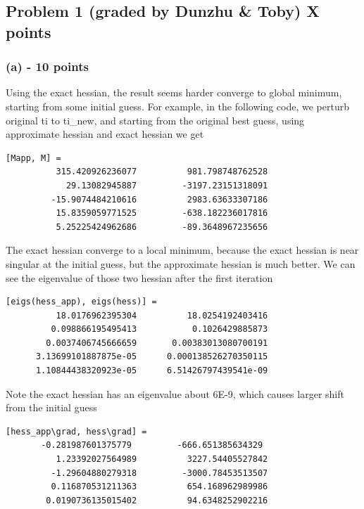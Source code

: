 \documentclass[11pt]{article}
\begin{document}
\lstset{language=Matlab,%
  breaklines=true,%
  morekeywords={matlab2tikz},
  keywordstyle=\color{blue},%
  morekeywords=[2]{1}, keywordstyle=[2]{\color{black}},
  identifierstyle=\color{black},%
  stringstyle=\color{mylilas},
  commentstyle=\color{mygreen},%
  showstringspaces=false,%
  numbers=left,%
  numberstyle={\tiny \color{black}},%
  numbersep=9pt, %
  emph=[1]{for,end,break},emphstyle=[1]\color{red}, %
}


\subsection*{Problem 1 (graded by Dunzhu \& Toby) X points}

\subsubsection*{(a) - 10 points}
Using the exact hessian, the result seems harder converge to global minimum,  starting from some initial guess. For example, in the following code, we perturb original ti to ti\_new, and starting from the original best guess, using approximate hessian and exact hessian we get
\begin{verbatim}
[Mapp, M] = 
          315.420926236077          981.798748762528
            29.13082945887         -3197.23151318091
         -15.9074484210616          2983.63633307186
          15.8359059771525         -638.182236017816
          5.25225424962686         -89.3648967235656
\end{verbatim}

The exact hessian converge to a local minimum, because the exact hessian is near singular at the initial guess, but the approximate hessian is much better. We can see the eigenvalue of those two hessian after the first iteration
\begin{verbatim}
[eigs(hess_app), eigs(hess)] =
          18.0176962395304          18.0254192403416
         0.098866195495413           0.1026429885873
        0.0037406745666659       0.00383013080700191
      3.13699101887875e-05      0.000138526270350115
      1.10844438320923e-05      6.51426797439541e-09
\end{verbatim}
Note the exact hessian has an eigenvalue about 6E-9, which causes larger shift from the initial guess
\begin{verbatim}
[hess_app\grad, hess\grad] =
       -0.281987601375779         -666.651385634329
          1.23392027564989          3227.54405527842
         -1.29604880279318         -3000.78453513507
         0.116870531211363          654.168962989986
        0.0190736135015402          94.6348252902216
\end{verbatim}
\end{document}
